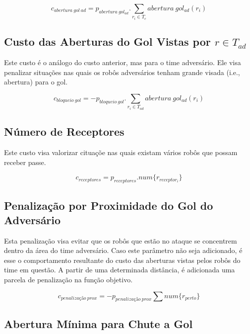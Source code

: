 \begin{dmath}
   c_{abertura{\ }gol{\ }ad} = p_{abertura{\ }gol_{ad}} .
    \sum_{r_i \in T_c} abertura{\ }gol_{ad}(r_i)
\end{dmath}

\subsection{Custo das Aberturas do Gol Vistas por $r\in T_{ad}$}

Este custo é o análogo do custo anterior, mas para o time adversário. Ele visa
penalizar situações nas quais os robôs adversários tenham grande visada (i.e.,
abertura) para o gol.

\begin{dmath}
   c_{bloqueio{\ }gol} = - p_{bloqueio{\ }gol} .
    \sum_{r_i \in T_{ad}} abertura{\ }gol_{ad}(r_i)
\end{dmath}

\subsection{Número de Receptores}

Este custo visa valorizar cituaçõe nas quais existam vários robôs que possam
receber passe.

\begin{dmath}
  c_{receptores} = p_{receptores} .
   num \lbrace r_{receptor_i} \rbrace
\end{dmath}

\subsection{Penalização por Proximidade do Gol do Adversário}

Esta penalização visa evitar que os robôs que estão no ataque se concentrem
dentro da área do time adversário. Caso este parâmetro não seja adicionado, é
esse o comportamento resultante do custo das aberturas vistas pelos robôs do
time em questão.  A partir de uma determinada distância, é adicionada uma
parcela de penalização na função objetivo.

\begin{dmath}
  c_{penalização{\ }prox} = - p_{penalização{\ }prox}
    \sum num \lbrace r_{perto} \rbrace
\end{dmath}

\subsection{Abertura Mínima para Chute a Gol}

